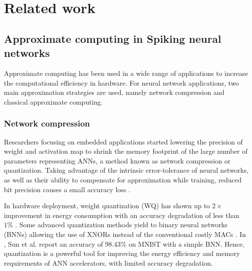 \section{Related work}
\label{sec:related_work}
\subsection{Approximate computing in Spiking neural networks}
Approximate computing has been used in a wide range of applications to increase the computational efficiency in hardware\cite{han2013approximate}. For neural network applications, two main approximation strategies are used, namely network compression and classical approximate computing\cite{bouvier2019spiking}.

\subsubsection{Network compression}
Researchers focusing on embedded applications started lowering the precision of weight and activation map to shrink the memory footprint of the large number of parameters representing ANNs, a method known as network compression or quantization. Taking advantage of the intrinsic error-tolerance of neural networks, as well as their ability to compensate for approximation while training, reduced bit precision causes a small accuracy loss \cite{courbariaux2015binaryconnect, han2015deep, hubara2017quantized, rastegari2016xnor}.

In hardware deployment, weight quantization (WQ) has shown up to $2\times$ improvement in energy consumption with an accuracy degradation of less than $1\%$ \cite{moons20160, whatmough201714}. Some advanced quantization methods yield to binary neural networks (BNNs) allowing the use of XNORs instead of the conventional costly MACs \cite{rastegari2016xnor}. In \cite{sun2018xnor}, Sun et al. report an accuracy of $98.43\%$ on MNIST with a simple BNN. Hence, quantization is a powerful tool for improving the energy efficiency and memory requirements of ANN accelerators, with limited accuracy degradation.

